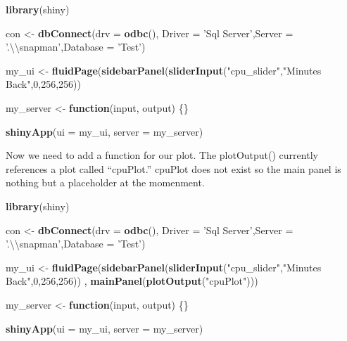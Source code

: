 \documentclass[]{article}
\newenvironment{Shaded}{\begin{snugshade}}{\end{snugshade}}
\newcommand{\CharTok}[1]{\textcolor[rgb]{0.31,0.60,0.02}{#1}}
\newcommand{\ControlFlowTok}[1]{\textcolor[rgb]{0.13,0.29,0.53}{\textbf{#1}}}
\newcommand{\DataTypeTok}[1]{\textcolor[rgb]{0.13,0.29,0.53}{#1}}
\newcommand{\DecValTok}[1]{\textcolor[rgb]{0.00,0.00,0.81}{#1}}
\newcommand{\KeywordTok}[1]{\textcolor[rgb]{0.13,0.29,0.53}{\textbf{#1}}}
\newcommand{\NormalTok}[1]{#1}
\newcommand{\StringTok}[1]{\textcolor[rgb]{0.31,0.60,0.02}{#1}}
\begin{document}
\begin{Shaded}
\begin{Highlighting}[]
\KeywordTok{library}\NormalTok{(shiny)}

\NormalTok{con <-}\StringTok{ }\KeywordTok{dbConnect}\NormalTok{(}\DataTypeTok{drv =} \KeywordTok{odbc}\NormalTok{(),  }\DataTypeTok{Driver =} \StringTok{'Sql Server'}\NormalTok{,}\DataTypeTok{Server =} \StringTok{'.}\CharTok{\textbackslash{}\textbackslash{}}\StringTok{snapman'}\NormalTok{,}\DataTypeTok{Database =} \StringTok{'Test'}\NormalTok{)}

\NormalTok{my_ui <-}\StringTok{ }\KeywordTok{fluidPage}\NormalTok{(}\KeywordTok{sidebarPanel}\NormalTok{(}\KeywordTok{sliderInput}\NormalTok{(}\StringTok{"cpu_slider"}\NormalTok{,}\StringTok{"Minutes Back"}\NormalTok{,}\DecValTok{0}\NormalTok{,}\DecValTok{256}\NormalTok{,}\DecValTok{256}\NormalTok{))}

\NormalTok{my_server <-}\StringTok{ }\ControlFlowTok{function}\NormalTok{(input, output) \{\}}

\KeywordTok{shinyApp}\NormalTok{(}\DataTypeTok{ui =}\NormalTok{ my_ui, }\DataTypeTok{server =}\NormalTok{ my_server)}
\end{Highlighting}
\end{Shaded}

Now we need to add a function for our plot. The plotOutput() currently
references a plot called ``cpuPlot.'' cpuPlot does not exist so the main
panel is nothing but a placeholder at the momenment.

\begin{Shaded}
\begin{Highlighting}[]
\KeywordTok{library}\NormalTok{(shiny)}

\NormalTok{con <-}\StringTok{ }\KeywordTok{dbConnect}\NormalTok{(}\DataTypeTok{drv =} \KeywordTok{odbc}\NormalTok{(),  }\DataTypeTok{Driver =} \StringTok{'Sql Server'}\NormalTok{,}\DataTypeTok{Server =} \StringTok{'.}\CharTok{\textbackslash{}\textbackslash{}}\StringTok{snapman'}\NormalTok{,}\DataTypeTok{Database =} \StringTok{'Test'}\NormalTok{)}

\NormalTok{my_ui <-}\StringTok{ }\KeywordTok{fluidPage}\NormalTok{(}\KeywordTok{sidebarPanel}\NormalTok{(}\KeywordTok{sliderInput}\NormalTok{(}\StringTok{"cpu_slider"}\NormalTok{,}\StringTok{"Minutes Back"}\NormalTok{,}\DecValTok{0}\NormalTok{,}\DecValTok{256}\NormalTok{,}\DecValTok{256}\NormalTok{))}
\NormalTok{                   , }\KeywordTok{mainPanel}\NormalTok{(}\KeywordTok{plotOutput}\NormalTok{(}\StringTok{"cpuPlot"}\NormalTok{)))}

\NormalTok{my_server <-}\StringTok{ }\ControlFlowTok{function}\NormalTok{(input, output) \{\}}

\KeywordTok{shinyApp}\NormalTok{(}\DataTypeTok{ui =}\NormalTok{ my_ui, }\DataTypeTok{server =}\NormalTok{ my_server)}
\end{Highlighting}
\end{Shaded}
\end{document}
